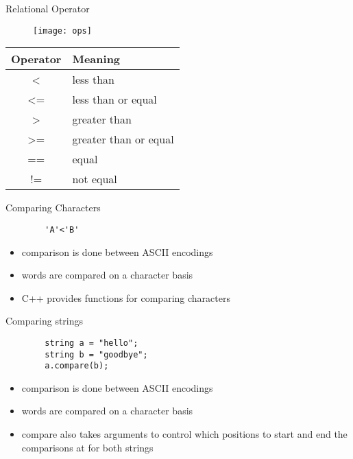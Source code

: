 \documentclass[xcolor={dvipsnames}]{beamer}
\begin{document}
\begin{frame}{Relational Operator}
	\begin{figure}
		\texttt{[image: ops]}
	\end{figure}
	\pause
	\begin{center}
	\begin{tabular}{|c|l|}
		\hline
		\textbf{Operator} & \textbf{Meaning}\\
		\hline
		\textless & less than \\
		\textless= & less than or equal \\
		\textgreater & greater than \\
		\textgreater= & greater than or equal \\
		== & equal  \\
		!= & not equal \\
		\hline
	\end{tabular}
	\end{center}
\end{frame}

\begin{frame}[fragile]{Comparing Characters}
\Huge
	\begin{block}{}
	\begin{verbatim}
		'A'<'B'
	\end{verbatim}
	\end{block}
	\begin{block}{}
\normalsize
	\begin{itemize}
		\item comparison is done between ASCII encodings 
		\item words are compared on a character basis
		\item C++ provides functions for comparing characters
	\end{itemize}
	\end{block}
\end{frame}

\begin{frame}[fragile]{Comparing strings}
	\begin{block}{}
\Huge
	\begin{verbatim}
		string a = "hello";
		string b = "goodbye";
		a.compare(b);
	\end{verbatim}
	\end{block}
	\begin{block}{}
\normalsize
	\begin{itemize}
		\item comparison is done between ASCII encodings 
		\item words are compared on a character basis
		\item compare also takes arguments to control which positions to start and end the comparisons at for both strings
	\end{itemize}
	\end{block}
\end{frame}
\end{document}
